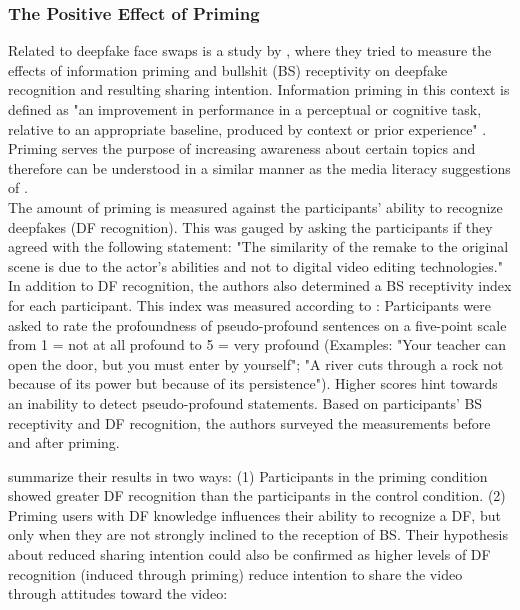 \documentclass[
  a4paper,  %
  twoside,  %
  bibliography=totoc,
  headsepline,
  cleardoublepage=empty,
  parskip=half,
  draft=false
]{scrbook}
\begin{document}
\subsubsection*{The Positive Effect of Priming}
Related to deepfake face swaps is a study by \citeauthor{iacobucciDeepfakesUnmaskedEffects2021}, where they tried to measure the effects of information priming and bullshit (BS) receptivity on deepfake recognition and resulting sharing intention. Information priming in this context is defined as "an improvement in performance in a perceptual or cognitive task, relative to an appropriate baseline, produced by context or prior experience" \cite{iacobucciDeepfakesUnmaskedEffects2021}. Priming serves the purpose of increasing awareness about certain topics and therefore can be understood in a similar manner as the media literacy suggestions of \citeauthor{hwangEffectsDisinformationUsing2021}. \\
The amount of priming is measured against the participants' ability to recognize deepfakes (DF recognition). This was gauged by asking the participants if they agreed with the following statement: "The similarity of the remake to the original scene is due to the actor's abilities and not to digital video editing technologies." In addition to DF recognition, the authors also determined a BS receptivity index for each participant. This index was measured according to \cite{pennycookReceptionDetectionPseudoprofound2015}: Participants were asked to rate the profoundness of pseudo-profound sentences on a five-point scale from 1 = not at all profound to 5 = very profound (Examples: "Your teacher can open the door, but you must enter by yourself"; "A river cuts through a rock not because of its power but because of its persistence"). Higher scores hint towards an inability to detect pseudo-profound statements. Based on participants' BS receptivity and DF recognition, the authors surveyed the measurements before and after priming.

\citeauthor{iacobucciDeepfakesUnmaskedEffects2021} summarize their results in two ways: (1) Participants in the priming condition showed greater DF recognition than the participants in the control condition. (2) Priming users with DF knowledge influences their ability to recognize a DF, but only when they are not strongly inclined to the reception of BS. Their hypothesis about reduced sharing intention could also be confirmed as higher levels of DF recognition (induced through priming) reduce intention to share the video through attitudes toward the video:
\end{document}
